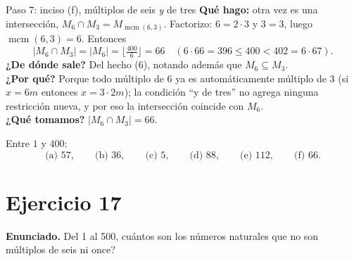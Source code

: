 \documentclass[11pt]{article}
\begin{document}
\begin{sol}
\begin{paso}{Paso 7: inciso (f), m\'ultiplos de seis \emph{y} de tres}
\textbf{Qu\'e hago:} otra vez es una intersecci\'on, $M_6\cap M_3 = M_{\operatorname{mcm}(6,3)}$. Factorizo: $6=2\cdot 3$ y $3=3$, luego $\operatorname{mcm}(6,3)=6$. Entonces
\[
|M_6\cap M_3| = |M_6| = \Big\lfloor \tfrac{400}{6}\Big\rfloor = 66 \quad (6\cdot 66 = 396 \le 400 < 402 = 6\cdot 67).
\]
\textbf{¿De d\'onde sale?} Del hecho (6), notando adem\'as que $M_6\subseteq M_3$.\\
\textbf{¿Por qu\'e?} Porque todo m\'ultiplo de $6$ ya es autom\'aticamente m\'ultiplo de $3$ (si $x=6m$ entonces $x=3\cdot 2m$); la condici\'on ``y de tres'' no agrega ninguna restricci\'on nueva, y por eso la intersecci\'on coincide con $M_6$.\\
\textbf{¿Qu\'e tomamos?} $|M_6\cap M_3| = 66$.
\end{paso}

\end{sol}

\begin{resp}
Entre $1$ y $400$:
\[
\text{(a) } 57, \qquad \text{(b) } 36, \qquad \text{(c) } 5, \qquad \text{(d) } 88, \qquad \text{(e) } 112, \qquad \text{(f) } 66 .
\]
\end{resp}

\newpage

\section*{Ejercicio 17}

\textbf{Enunciado.} Del 1 al 500, cu\'antos son los n\'umeros naturales que no son m\'ultiplos de seis ni once?
\end{document}
